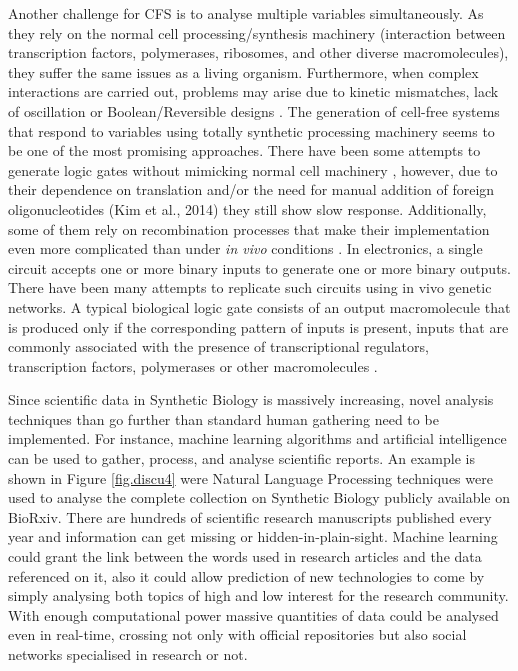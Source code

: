 Another challenge for CFS is to analyse multiple variables simultaneously. As they rely on the normal cell processing/synthesis machinery (interaction between transcription factors, polymerases, ribosomes, and other diverse macromolecules), they suffer the same issues as a living organism. Furthermore, when complex interactions are carried out, problems may arise due to kinetic mismatches, lack of oscillation or Boolean/Reversible designs \citep{guz2016bioelectronic}. The generation of cell-free systems that respond to variables using totally synthetic processing machinery seems to be one of the most promising approaches. There have been some attempts to generate logic gates without mimicking normal cell machinery \citep{bordoy2016transcriptional, chatterjee2016computing, kim2011switch, zhang2016dna}, however, due to their dependence on translation and/or the need for manual addition of foreign oligonucleotides (Kim et al., 2014) they still show slow response. Additionally, some of them rely on recombination processes that make their implementation even more complicated than under \textit{in vivo} conditions \citep{zhang2016dna}. In electronics, a single circuit accepts one or more binary inputs to generate one or more binary outputs. There have been many attempts to replicate such circuits using in vivo genetic networks. A typical biological logic gate consists of an output macromolecule that is produced only if the corresponding pattern of inputs is present, inputs that are commonly associated with the presence of transcriptional regulators, transcription factors, polymerases or other macromolecules \citep{silva2008mining}.


Since scientific data in Synthetic Biology is massively increasing, novel analysis techniques than go further than standard human gathering need to be implemented. For instance, machine learning algorithms and artificial intelligence can be used to gather, process, and analyse scientific reports. An example is shown in Figure \ref{fig.discu4} were Natural Language Processing techniques were used to analyse the complete collection on Synthetic Biology publicly available on BioRxiv. There are hundreds of scientific research manuscripts published every year and information can get missing or hidden-in-plain-sight. Machine learning could grant the link between the words used in research articles and the data referenced on it, also it could allow prediction of new technologies to come by simply analysing both topics of high and low interest for the research community. With enough computational power massive quantities of data could be analysed even in real-time, crossing not only with official repositories but also social networks specialised in research or not.

